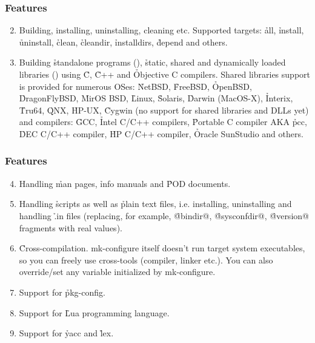 \documentclass[hyperref={colorlinks=true}]{beamer}
\begin{document}
\begin{frame}[fragile,t]
  \frametitle{Features}
  \begin{block}{}
  \begin{enumerate}
  \setcounter{enumi}{1}
  \item Building, installing, uninstalling, cleaning
    etc. Supported targets: \h{all}, \h{install},
    \h{uninstall},
    \h{clean}, \h{cleandir}, \h{installdirs}, \h{depend}
    and others.
  \item Building \h{standalone programs} (),
    \h{static, shared and dynamically loaded libraries}
    () using \h{C},
    \h{C++} and \h{Objective C} compilers.
    Shared libraries
    support is provided for numerous OSes: \h{NetBSD}, \h{FreeBSD},
    \h{OpenBSD},
    \h{DragonFlyBSD}, \h{MirOS BSD}, \h{Linux}, \h{Solaris}, \h{Darwin}
    (MacOS-X), \h{Interix}, \h{Tru64},
    \h{QNX}, \h{HP-UX}, \h{Cygwin} (no support for shared libraries
    and DLLs yet) and
    compilers: \h{GCC}, \h{Intel C/C++} compilers, \h{Portable C compiler} AKA
    \h{pcc}, \h{DEC C/C++ compiler}, \h{HP C/C++ compiler},
    \h{Oracle SunStudio} and others.
  \end{enumerate}
  \end{block}
\end{frame}


\begin{frame}[fragile,t]
  \frametitle{Features}
  \begin{block}{}
  \begin{enumerate}
  \setcounter{enumi}{3}
  \item Handling \h{man} pages, \h{info} manuals and \h{POD} documents.
  \item Handling \h{scripts} as well as \h{plain text files},
    i.e. installing, uninstalling and handling \h{.in files}
    (replacing, for example, \h{@bindir@}, \h{@sysconfdir@}, \h{@version@}
    fragments with real values).
  \item \h{Cross-compilation}. mk-configure itself doesn't run
    target system
    executables, so you can freely use cross-tools (compiler, linker
    etc.).  You can also override/set any variable initialized by mk-configure.
  \item Support for \h{pkg-config}.
  \item Support for \h{Lua} programming language.
  \item Support for \h{yacc} and \h{lex}.
  \end{enumerate}
  \end{block}
\end{frame}
\end{document}
